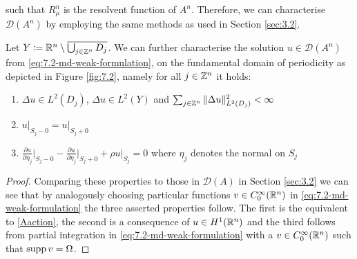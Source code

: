 such that $R_{\mu}^{n}$ is the resolvent function of $A^{n}$. Therefore, we can characterise $\mathcal{D}(A^{n})$ by employing the same methods as used in Section \ref{sec:3.2}.

\begin{theorem} \label{thrm:7.2}
Let $Y \coloneqq \mathbb{R}^{n} \setminus \overline{\bigcup_{j \in \mathbb{Z}^{n}} D_{j}}$. We can further characterise the solution $u \in \mathcal{D}(A^{n})$ from \eqref{eq:7.2-md-weak-formulation}, on the fundamental domain of periodicity as depicted in  Figure \ref{fig:7.2}, namely for all $j \in \mathbb{Z}^{n}$ it holds:
	\begin{enumerate}[label=\alph*\upshape)]
		\item $\Delta u \in L^{2}(D_{j})$, $\Delta u \in L^{2}(Y)$ and $\sum_{j \in \mathbb{Z}^{n}} \|\Delta u \|_{L^{2}(D_{j})}^{2} < \infty$
		\item $u \big|_{S_{j} - 0} = u \big|_{S_{j} + 0}$
		\item $\frac{\partial u}{\partial \eta_{j}} \big|_{S_{j} - 0} - \frac{\partial u}{\partial \eta_{j}} \big|_{S_{j} + 0} + \rho u \big|_{S_{j}} = 0$ where $\eta_{j}$ denotes the normal on $S_{j}$
	\end{enumerate}
\end{theorem}

\begin{proof}
 	Comparing these properties to those in $\mathcal{D}(A)$ in Section \ref{sec:3.2} we can see that by analogously choosing particular functions $v \in C_{0}^{\infty}(\mathbb{R}^{n})$ in \eqref{eq:7.2-md-weak-formulation} the three asserted properties follow. The first is the equivalent to \eqref{Aaction}, the second is a consequence of $u \in H^{1}(\mathbb{R}^{n})$ and the third follows from partial integration in \eqref{eq:7.2-md-weak-formulation} with a $v \in C_{0}^{\infty}(\mathbb{R}^{n})$ such that $\operatorname{supp} v = \Omega$.
\end{proof}

